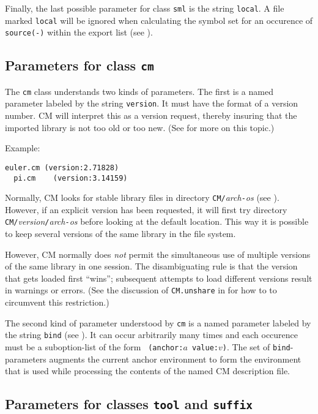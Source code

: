 Finally, the last possible parameter for class {\tt sml} is the string
{\tt local}.  A file marked {\tt local} will be ignored when
calculating the symbol set for an occurence of {\tt source(-)} within
the export list (see ).

\subsection{Parameters for class {\tt cm}}
\label{sec:toolparam:cm}

The {\tt cm} class understands two kinds of parameters.  The first is
a named parameter labeled by the string {\tt version}.  It must have
the format of a version number.  CM will interpret this as a version
request, thereby insuring that the imported library is not too old or
too new. (See  for more on this topic.)

Example:

\begin{lstlisting}[language=CM]
  euler.cm (version:2.71828)
  pi.cm    (version:3.14159)
\end{lstlisting}%

Normally, CM looks for stable library files in directory
{\tt CM/}{\it arch}{\tt -}{\it os} (see ).
However, if an explicit version has been requested, it will first try
directory {\tt CM/}{\it version}{\tt /}{\it arch}{\tt -}{\it os}
before looking at the default location.  This way it is possible to
keep several versions of the same library in the file system.

However, CM normally does {\em not} permit the simultaneous use of
multiple versions of the same library in one session.  The
disambiguating rule is that the version that gets loaded first
``wins''; subsequent attempts to load different versions result in
warnings or errors.  (See the discussion of {\tt CM.unshare} in
 for how to to circumvent this restriction.)

The second kind of parameter understood by {\tt cm} is a named
parameter labeled by the string {\tt bind} (see
).  It can occur arbitrarily many times
and each occurence must be a suboption-list of the form {\tt
(anchor:$a$ value:$v$)}.  The set of {\tt bind}-parameters augments
the current anchor environment to form the environment that is used
while processing the contents of the named CM description file.

\subsection{Parameters for classes {\tt tool} and {\tt suffix}}

